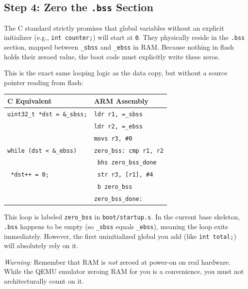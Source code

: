 \subsection{Step 4: Zero the \texttt{.bss} Section}
The C standard strictly promises that global variables without an explicit initializer (e.g., \texttt{int counter;}) will start at \texttt{0}. They physically reside in the \texttt{.bss} section, mapped between \texttt{\_sbss} and \texttt{\_ebss} in RAM. Because nothing in flash holds their zeroed value, the boot code must explicitly write these zeros. 

This is the exact same looping logic as the data copy, but without a source pointer reading from flash:

\begin{table}[h!]
    \centering
    \begin{tabular}{|l|l|}
        \hline
        \textbf{C Equivalent} & \textbf{ARM Assembly} \\ \hline
        \texttt{uint32\_t *dst = \&\_sbss;} & \texttt{ldr r1, =\_sbss} \\
        \texttt{                      } & \texttt{ldr r2, =\_ebss} \\
        \texttt{                      } & \texttt{movs r3, \#0} \\ \hline
        \texttt{while (dst < \&\_ebss)} & \texttt{zero\_bss: cmp r1, r2} \\
        \texttt{                      } & \texttt{           bhs zero\_bss\_done} \\ \hline
        \texttt{    *dst++ = 0;       } & \texttt{           str r3, [r1], \#4} \\
        \texttt{                      } & \texttt{           b   zero\_bss} \\ \hline
        \texttt{                      } & \texttt{zero\_bss\_done:} \\ \hline
    \end{tabular}
\end{table}

This loop is labeled \texttt{zero\_bss} in \texttt{boot/startup.s}. In the current base skeleton, \texttt{.bss} happens to be empty (so \texttt{\_sbss} equals \texttt{\_ebss}), meaning the loop exits immediately. However, the first uninitialized global you add (like \texttt{int total;}) will absolutely rely on it. 

\textit{Warning:} Remember that RAM is \textit{not} zeroed at power-on on real hardware. While the QEMU emulator zeroing RAM for you is a convenience, you must not architecturally count on it.

